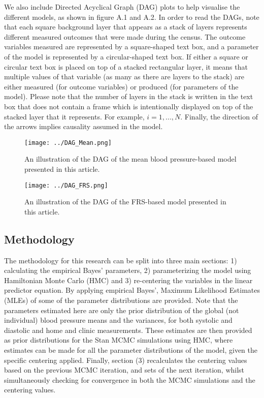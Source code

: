 \documentclass[
]{article}
\begin{document}
We also include Directed Acyclical Graph (DAG) plots to help visualise
the different models, as shown in figure A.1 and A.2. In order to read
the DAGs, note that each square background layer that appears as a stack
of layers represents different measured outcomes that were made during
the census. The outcome variables measured are represented by a
square-shaped text box, and a parameter of the model is represented by a
circular-shaped text box. If either a square or circular text box is
placed on top of a stacked rectangular layer, it means that multiple
values of that variable (as many as there are layers to the stack) are
either measured (for outcome variables) or produced (for parameters of
the model). Please note that the number of layers in the stack is
written in the text box that does not contain a frame which is
intentionally displayed on top of the stacked layer that it represents.
For example, \(i=1,...,N\). Finally, the direction of the arrows implies
causality assumed in the model.

\begin{figure}
\centering
\texttt{[image: ../DAG\_Mean.png]}
\caption{An illustration of the DAG of the mean blood pressure-based
model presented in this article.}
\end{figure}

\begin{figure}
\centering
\texttt{[image: ../DAG\_FRS.png]}
\caption{An illustration of the DAG of the FRS-based model presented in
this article.}
\end{figure}

\hypertarget{methodology}{%
\subsection{Methodology}\label{methodology}}

The methodology for this research can be split into three main sections:
1) calculating the empirical Bayes' parameters, 2) parameterizing the
model using Hamiltonian Monte Carlo (HMC) and 3) re-centering the
variables in the linear predictor equation. By applying empirical
Bayes', Maximum Likelihood Estimates (MLEs) of some of the parameter
distributions are provided. Note that the parameters estimated here are
only the prior distribution of the global (not individual) blood
pressure means and the variances, for both systolic and diastolic and
home and clinic measurements. These estimates are then provided as prior
distributions for the Stan MCMC simulations using HMC, where estimates
can be made for all the parameter distributions of the model, given the
specific centering applied. Finally, section (3) recalculates the
centering values based on the previous MCMC iteration, and sets of the
next iteration, whilst simultaneously checking for convergence in both
the MCMC simulations and the centering values.
\end{document}
